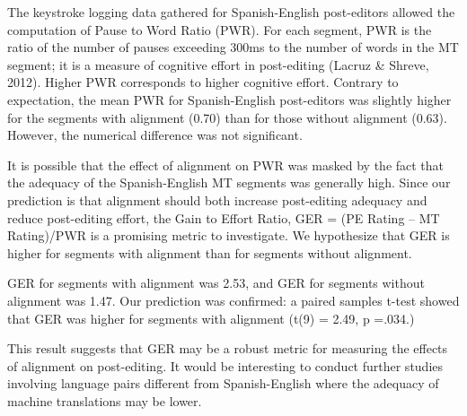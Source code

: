The keystroke logging data gathered for Spanish-English post-editors allowed the computation of Pause to Word Ratio (PWR). For each segment, PWR is the ratio of the number of pauses exceeding 300ms to the number of words in the MT segment; it is a measure of cognitive effort in post-editing (Lacruz & Shreve, 2012). Higher PWR corresponds to higher cognitive effort.
Contrary to expectation, the mean PWR for Spanish-English post-editors was slightly higher for the segments with alignment (0.70) than for those without alignment (0.63). However, the numerical difference was not significant. 

It is possible that the effect of alignment on PWR was masked by the fact that the adequacy of the Spanish-English MT segments was generally high. Since our prediction is that alignment should both increase post-editing adequacy and reduce post-editing effort, the Gain to Effort Ratio, GER = (PE Rating – MT Rating)/PWR is a promising metric to investigate. We hypothesize that GER is higher for segments with alignment than for segments without alignment. 

GER for segments with alignment was 2.53, and GER for segments without alignment was 1.47. Our prediction was confirmed: a paired samples t-test showed that GER was higher for segments with alignment (t(9) = 2.49, p =.034.)

This result suggests that GER may be a robust metric for measuring the effects of alignment on post-editing. It would be interesting to conduct further studies involving language pairs different from Spanish-English where the adequacy of machine translations may be lower.













